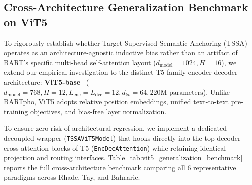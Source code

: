 \documentclass[11pt,a4paper]{article}
\begin{document}
\subsection{Cross-Architecture Generalization Benchmark on ViT5}
\label{sec:vit5_generalization}

To rigorously establish whether Target-Supervised Semantic Anchoring (TSSA) operates as an architecture-agnostic inductive bias rather than an artifact of BART's specific multi-head self-attention layout ($d_{\text{model}} = 1024, H = 16$), we extend our empirical investigation to the distinct T5-family encoder-decoder architecture: \textbf{ViT5-base}~\cite{phan2022vit5,raffel2020exploring} ($d_{\text{model}} = 768, H = 12, L_{\text{enc}} = L_{\text{dec}} = 12, d_{kv} = 64, 220\text{M parameters}$). Unlike BARTpho, ViT5 adopts relative position embeddings, unified text-to-text pre-training objectives, and bias-free layer normalization.

To ensure zero risk of architectural regression, we implement a dedicated decoupled wrapper (\texttt{TSSAViT5Model}) that hooks directly into the top decoder cross-attention blocks of T5 (\texttt{EncDecAttention}) while retaining identical projection and routing interfaces. Table~\ref{tab:vit5_generalization_benchmark} reports the full cross-architecture benchmark comparing all 6 representative paradigms across Rhade, Tay, and Bahnaric.
\end{document}
